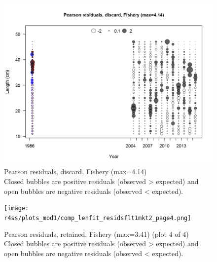 \documentclass[12pt,]{article}
\begin{document}
\begin{figure}
\centering
\includegraphics{r4ss/plots_mod1/comp_lenfit_residsflt1mkt1.png}
\caption{Pearson residuals, discard, Fishery (max=4.14)\\
Closed bubbles are positive residuals (observed \textgreater{} expected)
and open bubbles are negative residuals (observed \textless{} expected).
\label{fig:discard_len_pearson}}
\end{figure}

\begin{figure}
\centering
\texttt{[image: r4ss/plots\_mod1/comp\_lenfit\_residsflt1mkt2\_page4.png]}
\caption{Pearson residuals, retained, Fishery (max=3.41) (plot 4 of 4)\\
Closed bubbles are positive residuals (observed \textgreater{} expected)
and open bubbles are negative residuals (observed \textless{} expected).
\label{fig:fishery_len_pearson}}
\end{figure}
\end{document}
